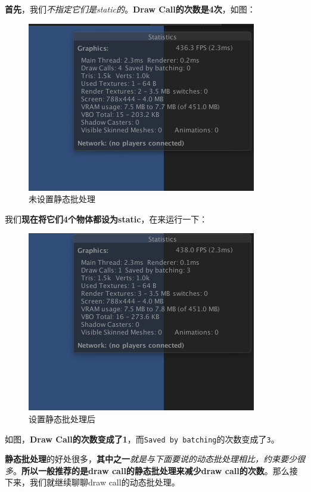 \documentclass[UTF8,a4paper,12pt]{ctexart}
\begin{document}
		  			\textbf{首先}，我们\textit{不指定它们是static的}。\textbf{Draw Call的次数是4次}，如图：
		  				\begin{figure}[H]
		  					\centering
		  					\includegraphics[scale=0.8]{beforeStaticBatching2.png}
		  					\caption{未设置静态批处理}
		  				\end{figure}
		  			
		  			我们\textbf{现在将它们4个物体都设为static}，在来运行一下：
		  				\begin{figure}[H]
		  					\centering
		  					\includegraphics[scale=0.8]{afterStaticBatching.png}
		  					\caption{设置静态批处理后}
		  				\end{figure}
	  				
	  				如图，\textbf{Draw Call的次数变成了1}，而\verb|Saved by batching|的次数变成了\verb|3|。
	  				
	  				\textbf{静态批处理}的好处很多，\textbf{其中之一}\textit{就是与下面要说的动态批处理相比，约束要少很多}。\textbf{所以一般推荐的是draw call的静态批处理来减少draw call的次数}。那么接下来，我们就继续聊聊draw call的动态批处理。
	  				
\end{document}
